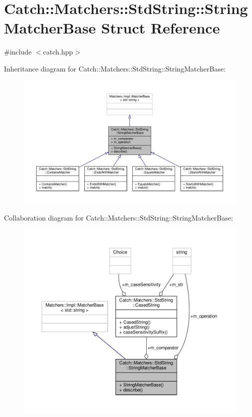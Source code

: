 \hypertarget{struct_catch_1_1_matchers_1_1_std_string_1_1_string_matcher_base}{\section{Catch\-:\-:Matchers\-:\-:Std\-String\-:\-:String\-Matcher\-Base Struct Reference}
\label{struct_catch_1_1_matchers_1_1_std_string_1_1_string_matcher_base}
}


{\ttfamily \#include $<$catch.\-hpp$>$}



Inheritance diagram for Catch\-:\-:Matchers\-:\-:Std\-String\-:\-:String\-Matcher\-Base\-:
\nopagebreak
\begin{figure}[H]
\begin{center}
\leavevmode
\includegraphics[width=350pt]{struct_catch_1_1_matchers_1_1_std_string_1_1_string_matcher_base__inherit__graph}
\end{center}
\end{figure}


Collaboration diagram for Catch\-:\-:Matchers\-:\-:Std\-String\-:\-:String\-Matcher\-Base\-:
\nopagebreak
\begin{figure}[H]
\begin{center}
\leavevmode
\includegraphics[width=350pt]{struct_catch_1_1_matchers_1_1_std_string_1_1_string_matcher_base__coll__graph}
\end{center}
\end{figure}
